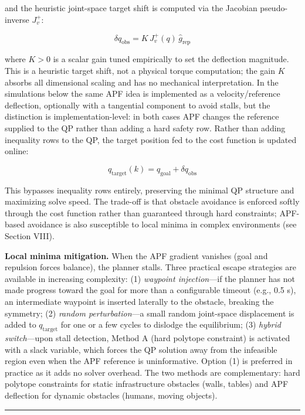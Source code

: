 and the heuristic joint-space target shift is computed via the Jacobian
pseudo-inverse \(J_v^+\):

\[\delta q_{\text{obs}} = K \, J_v^+(q) \, \hat{g}_{\text{rep}}\]

where \(K > 0\) is a scalar gain tuned empirically to set the deflection
magnitude. This is a heuristic target shift, not a physical torque
computation; the gain \(K\) absorbs all dimensional scaling and has no
mechanical interpretation. In the simulations below the same APF idea is
implemented as a velocity/reference deflection, optionally with a
tangential component to avoid stalls, but the distinction is
implementation-level: in both cases APF changes the reference supplied
to the QP rather than adding a hard safety row. Rather than adding
inequality rows to the QP, the target position fed to the cost function
is updated online:

\[q_{\text{target}}(k) = q_{\text{goal}} + \delta q_{\text{obs}}\]

This bypasses inequality rows entirely, preserving the minimal QP
structure and maximizing solve speed. The trade-off is that obstacle
avoidance is enforced softly through the cost function rather than
guaranteed through hard constraints; APF-based avoidance is also
susceptible to local minima in complex environments (see Section VIII).

\textbf{Local minima mitigation.} When the APF gradient vanishes (goal
and repulsion forces balance), the planner stalls. Three practical
escape strategies are available in increasing complexity: (1)
\emph{waypoint injection}---if the planner has not made progress toward
the goal for more than a configurable timeout (e.g., 0.5 s), an
intermediate waypoint is inserted laterally to the obstacle, breaking
the symmetry; (2) \emph{random perturbation}---a small random
joint-space displacement is added to \(q_\text{target}\) for one or a
few cycles to dislodge the equilibrium; (3) \emph{hybrid switch}---upon
stall detection, Method A (hard polytope constraint) is activated with a
slack variable, which forces the QP solution away from the infeasible
region even when the APF reference is uninformative. Option (1) is
preferred in practice as it adds no solver overhead. The two methods are
complementary: hard polytope constraints for static infrastructure
obstacles (walls, tables) and APF deflection for dynamic obstacles
(humans, moving objects).

\begin{center}\rule{0.5\linewidth}{0.5pt}\end{center}

